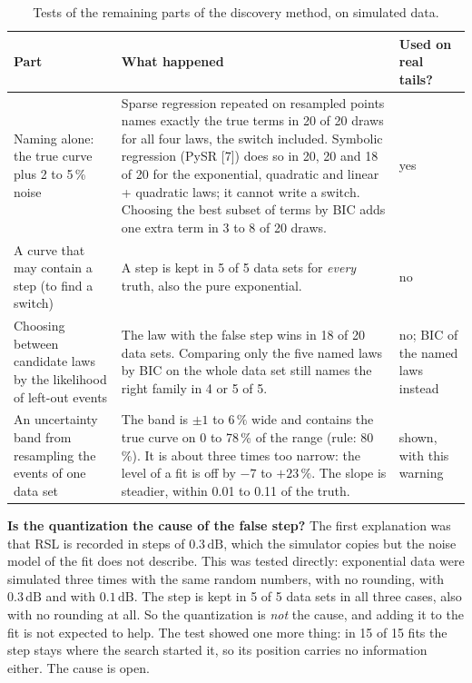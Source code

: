 \documentclass[11pt,a4paper]{article}
\newcommand{\dB}{\,\mathrm{dB}}
\begin{document}
\begin{table}[H]
\centering
\caption{Tests of the remaining parts of the discovery method, on simulated data.}
\label{tab:method}
\small
\begin{tabularx}{\linewidth}{@{}p{38mm} Y p{22mm}@{}}
\toprule
Part & What happened & Used on real tails? \\
\midrule
Naming alone: the true curve plus 2 to 5\,\% noise &
Sparse regression repeated on resampled points names exactly the true terms in 20 of 20 draws for all four laws,
the switch included. Symbolic regression (PySR [7]) does so in 20, 20 and 18 of 20 for the exponential, quadratic and
linear + quadratic laws; it cannot write a switch. Choosing the best subset of terms by BIC adds one extra term in 3 to 8
of 20 draws. & yes \\
A curve that may contain a step (to find a switch) &
A step is kept in 5 of 5 data sets for \emph{every} truth, also the pure exponential. & no \\
Choosing between candidate laws by the likelihood of left-out events &
The law with the false step wins in 18 of 20 data sets. Comparing only the five named laws by BIC on the whole data
set still names the right family in 4 or 5 of 5. & no; BIC of the named laws instead \\
An uncertainty band from resampling the events of one data set &
The band is $\pm 1$ to $6\,\%$ wide and contains the true curve on 0 to 78\,\% of the range (rule: 80\,\%). It is about
three times too narrow: the level of a fit is off by $-7$ to $+23\,\%$. The slope is steadier, within 0.01 to 0.11 of
the truth. & shown, with this warning \\
\bottomrule
\end{tabularx}
\end{table}

\textbf{Is the quantization the cause of the false step?} The first explanation was that RSL is recorded in steps
of $0.3\dB$, which the simulator copies but the noise model of the fit does not describe. This was tested directly:
exponential data were simulated three times with the same random numbers, with no rounding, with $0.3\dB$ and with
$0.1\dB$. The step is kept in 5 of 5 data sets in all three cases, also with no rounding at all. So the quantization is
\emph{not} the cause, and adding it to the fit is not expected to help. The test showed one more thing: in 15 of 15
fits the step stays where the search started it, so its position carries no information either. The cause is open.
\end{document}
